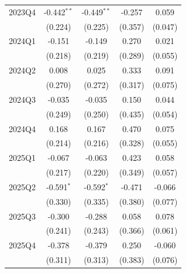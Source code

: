 \begin{table}[htbp]
\begin{tabular}{lcccc}
2023Q4 & -0.442$^{**}$ & -0.449$^{**}$ & -0.257 & 0.059 \\
 & (0.224) & (0.225) & (0.357) & (0.047) \\
2024Q1 & -0.151 & -0.149 & 0.270 & 0.021 \\
 & (0.218) & (0.219) & (0.289) & (0.055) \\
2024Q2 & 0.008 & 0.025 & 0.333 & 0.091 \\
 & (0.270) & (0.272) & (0.317) & (0.075) \\
2024Q3 & -0.035 & -0.035 & 0.150 & 0.044 \\
 & (0.249) & (0.250) & (0.435) & (0.054) \\
2024Q4 & 0.168 & 0.167 & 0.470 & 0.075 \\
 & (0.214) & (0.216) & (0.328) & (0.055) \\
2025Q1 & -0.067 & -0.063 & 0.423 & 0.058 \\
 & (0.217) & (0.220) & (0.349) & (0.057) \\
2025Q2 & -0.591$^{*}$ & -0.592$^{*}$ & -0.471 & -0.066 \\
 & (0.330) & (0.335) & (0.380) & (0.077) \\
2025Q3 & -0.300 & -0.288 & 0.058 & 0.078 \\
 & (0.241) & (0.243) & (0.366) & (0.061) \\
2025Q4 & -0.378 & -0.379 & 0.250 & -0.060 \\
 & (0.311) & (0.313) & (0.383) & (0.076) \\
\bottomrule
\end{tabular}
\par\vspace{2pt}{\footnotesize Reference quarter 2022Q3 omitted. Standard errors clustered on occupation in parentheses. * p<0.10, ** p<0.05, *** p<0.01.}
\end{table}
